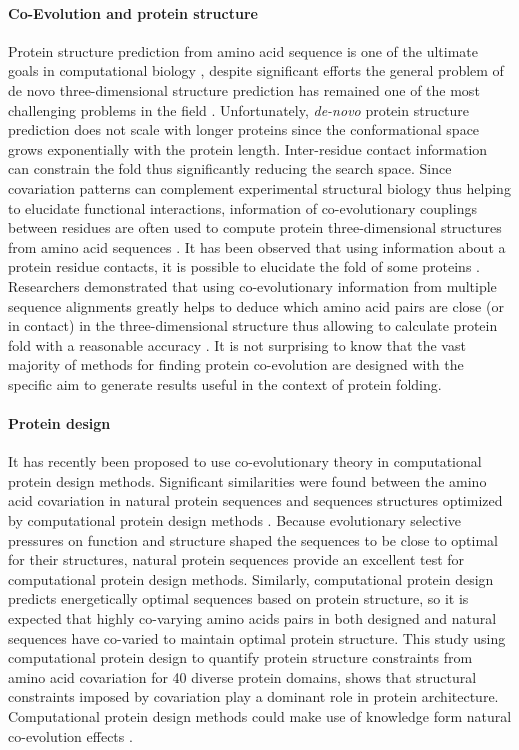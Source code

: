 \paragraph{Co-Evolution and protein structure}
Protein structure prediction from amino acid sequence is one of the ultimate goals in computational biology \cite{burger2010disentangling}, despite significant efforts the general problem of de novo three-dimensional structure prediction has remained one of the most challenging problems in the field \cite{marks2012protein}.
Unfortunately, \textit{de-novo} protein structure prediction does not scale with longer proteins since the conformational space grows exponentially with the protein length.
Inter-residue contact information can constrain the fold thus significantly reducing the search space.
Since covariation patterns can complement experimental structural biology thus helping to elucidate functional interactions, information of co-evolutionary couplings between residues are often used to compute protein three-dimensional structures from amino acid sequences \cite{marks2012protein}.
It has been observed that using information about a protein residue contacts, it is possible to elucidate the fold of some proteins \cite{jones2012psicov}.
Researchers demonstrated that using co-evolutionary information from multiple sequence alignments greatly helps to deduce which amino acid pairs are close (or in contact) in the three-dimensional structure thus allowing to calculate protein fold with a reasonable accuracy \cite{marks2012protein}.
It is not surprising to know that the vast majority of methods for finding protein co-evolution are designed with the specific aim to generate results useful in the context of protein folding.

\paragraph{Protein design}
It has recently been proposed to use co-evolutionary theory in computational protein design methods.
Significant similarities were found between the amino acid covariation in natural protein sequences and sequences structures optimized by computational protein design methods \cite{ollikainen2013computational}.
Because evolutionary selective pressures on function and structure shaped the sequences to be close to optimal for their structures, natural protein sequences provide an excellent test for computational protein design methods.
Similarly, computational protein design predicts energetically optimal sequences based on protein structure, so it is expected that highly co-varying amino acids pairs in both designed and natural sequences have co-varied to maintain optimal protein structure.
This study using computational protein design to quantify protein structure constraints from amino acid covariation for 40 diverse protein domains, shows that structural constraints imposed by covariation play a dominant role in protein architecture.
Computational protein design methods could make use of knowledge form natural co-evolution effects \cite{ollikainen2013computational}.

